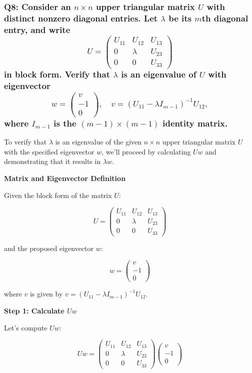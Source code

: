 \documentclass[8pt]{article}
\begin{document}
{\subsubsection*{Q8: Consider an \(n \times n\) upper triangular matrix \(U\) with distinct nonzero diagonal entries. Let \(\lambda\) be its \(m\)th diagonal entry, and write
\[
U = \begin{pmatrix}
U_{11} & U_{12} & U_{13} \\
0 & \lambda & U_{23} \\
0 & 0 & U_{33}
\end{pmatrix}
\]
in block form. Verify that \(\lambda\) is an eigenvalue of \(U\) with eigenvector
\[
w = \begin{pmatrix}
v \\
-1 \\
0
\end{pmatrix}, \quad v = (U_{11} - \lambda I_{m-1})^{-1} U_{12},
\]
where \(I_{m-1}\) is the \((m - 1) \times (m - 1)\) identity matrix.}

To verify that \(\lambda\) is an eigenvalue of the given \(n \times n\) upper triangular matrix \(U\) with the specified eigenvector \(w\), we'll proceed by calculating \(Uw\) and demonstrating that it results in \(\lambda w\).

\textbf{Matrix and Eigenvector Definition}

Given the block form of the matrix \(U\):

\[
U = \begin{pmatrix}
U_{11} & U_{12} & U_{13} \\
0 & \lambda & U_{23} \\
0 & 0 & U_{33}
\end{pmatrix}
\]

and the proposed eigenvector \(w\):

\[
w = \begin{pmatrix}
v \\
-1 \\
0
\end{pmatrix}
\]

where \(v\) is given by \(v = (U_{11} - \lambda I_{m-1})^{-1} U_{12}\).

\textbf{Step 1: Calculate \(Uw\)}

Let's compute \(Uw\):

\[
Uw = \begin{pmatrix}
U_{11} & U_{12} & U_{13} \\
0 & \lambda & U_{23} \\
0 & 0 & U_{33}
\end{pmatrix} \begin{pmatrix}
v \\
-1 \\
0
\end{pmatrix}
\]

}
\end{document}
